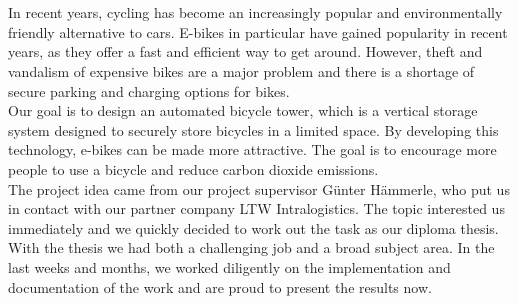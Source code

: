 \section*{}
In recent years, cycling has become an increasingly popular and environmentally friendly alternative to cars. E-bikes in particular have gained popularity in recent years, as they offer a fast and efficient way to get around. However, theft and vandalism of expensive bikes are a major problem and there is a shortage of secure parking and charging options for bikes. \\
Our goal is to design an automated bicycle tower, which is a vertical storage system designed to securely store bicycles in a limited space. By developing this technology, e-bikes can be made more attractive. The goal is to encourage more people to use a bicycle and reduce carbon dioxide emissions.\\
The project idea came from our project supervisor Günter Hämmerle, who put us in contact with our partner company LTW Intralogistics. The topic interested us immediately and we quickly decided to work out the task as our diploma thesis.\\
With the thesis we had both a challenging job and a broad subject area. In the last weeks and months, we worked diligently on the implementation and documentation of the work and are proud to present the results now.
